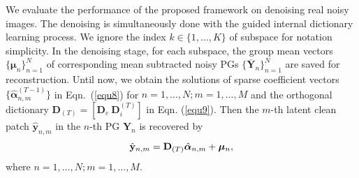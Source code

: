 \documentclass[10pt,twocolumn,letterpaper]{article}
\begin{document}
We evaluate the performance of the proposed framework on denoising real noisy images. The denoising is simultaneously done with the guided internal dictionary learning process. We ignore the index $k\in\{1,...,K\}$ of subspace for notation simplicity. In the denoising stage, for each subspace, the group mean vectors $\{\bm{\mu}_{n}\}_{n=1}^{N}$ of corresponding mean subtracted noisy PGs $\{\mathbf{\overline{Y}}_{n}\}_{n=1}^{N}$ are saved for reconstruction. Until now, we obtain the solutions of sparse coefficient vectors $\{\hat{\bm{\alpha}}_{n,m}^{(T-1)}\}$ in Eqn.\ (\ref{equ8}) for $n=1,...,N;m=1,...,M$ and the orthogonal dictionary $\mathbf{D}_{(T)} = [\mathbf{D}_{e}\ \mathbf{D}_{i}^{(T)}]$ in Eqn. (\ref{equ9}). Then the $m$-th latent clean patch $\hat{\mathbf{y}}_{n,m}$ in the $n$-th PG $\mathbf{Y}_{n}$ is recovered by 
\vspace{-2mm}
\begin{equation}\label{equ11}\vspace{-2mm}
\hat{\mathbf{y}}_{n,m}=\mathbf{D}_{(T)}\hat{\bm{\alpha}}_{n,m}+\bm{\mu}_{n},
\end{equation}
where $n=1,...,N;m=1,...,M$.
\end{document}
